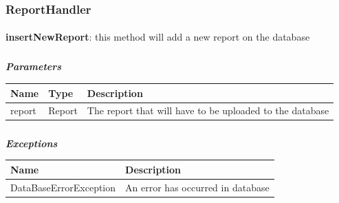 				\subsubsection{ReportHandler}
					\paragraph{}
							\textbf{insertNewReport}: this method will add a new report on the database
							\subparagraph{}
							\textit{\textbf{Parameters}}
							\vspace{-2mm}
								\begin{table}[!h]
									\begin{tabular}{L{0.15\textwidth}L{0.15\textwidth}L{0.5\textwidth}}
										\toprule
										\textbf{Name} & \textbf{Type} & \textbf{Description} \\
										\midrule
								  		report & Report & The report that will have to be uploaded to the database \\
								 		\bottomrule
									\end{tabular}
								\end{table}
							\vspace{-6mm}
							\subparagraph{}
							\textit{\textbf{Exceptions}}
							\vspace{-2mm}
								\begin{table}[!h]
									\begin{tabular}{L{0.35\textwidth}L{0.45\textwidth}}
										\toprule
										\textbf{Name} & \textbf{Description} \\
										\midrule
								  		DataBaseErrorException & An error has occurred in database \\
								 		\bottomrule
									\end{tabular}
								\end{table}
								
